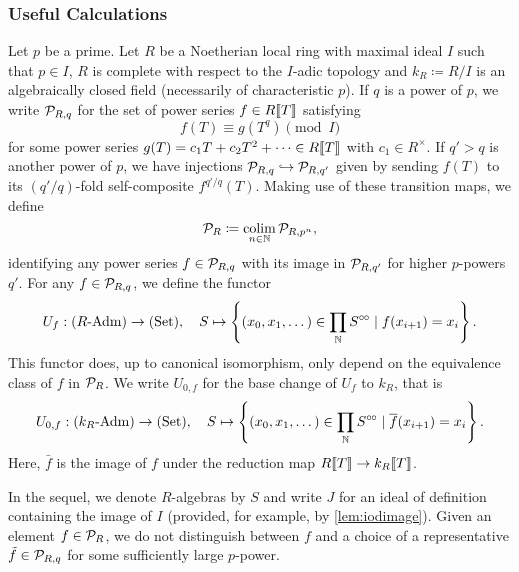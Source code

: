 \documentclass[../main.tex]{subfiles}
\begin{document}
\subsubsection{Useful Calculations} %
\label{ssub:Useful Calculations}
Let $p$ be a prime. Let $R$ be a Noetherian local ring with maximal ideal $I$
such that $p \in I$, $R$ is complete with respect to the $I$-adic topology and
$k_R \coloneqq R/I$ is an algebraically closed field (necessarily of
characteristic $p$). If $q$ is a power of $p$, we write $\mathcal{P}_{R,q}$ for the set
of power series $f \in R\llbracket T \rrbracket$ satisfying 
\begin{equation} \label{eq:condonpowerseries}
  f(T) \equiv g(T^q) \pmod I
\end{equation}
for some power series $g(T) = c_1 T + c_2 T^2 + \dots \in R\llbracket T \rrbracket$ with 
$c_1 \in R^\times$. 
If $q'>q$ is another power of $p$, we have injections $\mathcal{P}_{R,q} \hookrightarrow \mathcal{P}_{R,q'}$
given by sending $f(T)$ to its $(q'/q)$-fold self-composite $f^{q'/q}(T)$. 
Making use of these transition maps, we define
\begin{equation*}
  \mathcal{P}_R \coloneqq \operatorname*{colim}_{n \in \mathbb{N}} \mathcal{P}_{R, p^n},
\end{equation*}
identifying any power series $f \in \mathcal{P}_{R,q}$ with its image in $\mathcal{P}_{R,q'}$ for 
higher $p$-powers $q'$. 
For any $f \in \mathcal{P}_{R,q}$, we define the functor
\begin{equation*}
  U_f: {({R}\text-\allowbreak\mathrm{Adm})} \to {(\mathrm{Set})}, \quad S \mapsto \left\{(x_0,x_1, \dots) \in \prod_{\mathbb{N}} S^{\circ \hspace{-0.5pt} \circ} 
                                          \mid f(x_{i+1}) = x_i\right\}.
\end{equation*}
This functor does, up to canonical isomorphism, only depend on the equivalence
class of $f$ in $\mathcal{P}_R$. 
We write $U_{0,f}$ for the base change of $U_f$ to $k_R$, that is
\begin{equation*}
  U_{0,f}: {({k_R}\text-\allowbreak\mathrm{Adm})} \to {(\mathrm{Set})}, \quad S \mapsto \left\{(x_0,x_1, \dots) \in
                              \prod_{\mathbb{N}} S^{\circ \hspace{-0.5pt} \circ} \mid \overline f(x_{i+1}) = x_i\right\}.
\end{equation*}
Here, $\bar f$ is the image of $f$ under the reduction map $R\llbracket T \rrbracket \to
k_R\llbracket T \rrbracket$. 

In the sequel, we denote $R$-algebras by $S$ and write $J$ for an ideal
of definition containing the image of $I$ (provided, for example, by \ref{lem:iodimage}).
Given an element $f\in \mathcal{P}_R$, we do not distinguish between $f$ and a choice of a 
representative $\tilde f \in \mathcal{P}_{R,q}$ for some sufficiently large $p$-power.
\end{document}
